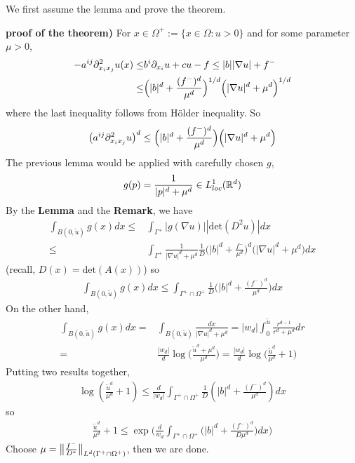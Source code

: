 \documentclass[12pt,a4paper]{article}
\newenvironment{proof}
{\begin{changemargin}{1cm}{0.5cm} 
	}%
	{\end{changemargin}
}
\newenvironment{p}
{\begin{proof} 
	}%
	{\end{proof}
}
\begin{document}
We first assume the lemma and prove the theorem.
\begin{p}
\textbf{proof of the theorem)} For $x\in \Omega^+ := \{x\in \Omega : u>0 \}$ and for some parameter $\mu>0$,
\begin{align*}
-a^{ij} \partial^2_{x_i x_j} u(x) \leq & b^i \partial_{x_i} u + cu -f \leq |b| |\nabla u| + f^- \\
\leq & \Big(|b|^d + \frac{(f^-)^d}{\mu^d} \Big)^{1/d} \Big(|\nabla u|^d + \mu^d \Big)^{1/d}
\end{align*}
where the last inequality follows from H\"older inequality. So
\begin{align*}
\big( a^{ij} \partial^2_{x_i x_j} u\big)^d \leq \Big(|b|^d + \frac{(f^-)^d}{\mu^d} \Big) \Big(|\nabla u|^d + \mu^d \Big)
\end{align*}
The previous lemma would be applied with carefully chosen $g$,
\begin{align*}
g(p) = \frac{1}{|p|^d + \mu^d} \in L^1_{loc}(\mathbb{R}^d)
\end{align*}
By the \textbf{Lemma} and the \textbf{Remark}, we have
\begin{align*}
\int_{B(0, \tilde{u})} g(x) dx \leq & \int_{\Gamma^+} |g(\nabla u)||\text{det}(D^2 u)| dx \\
\leq & \int_{\Gamma^+} \frac{1}{|\nabla u|^d + \mu^d} \frac{1}{D} \Big(|b|^d + \frac{f^-}{\mu^d} \Big)^d \Big(|\nabla u|^d + \mu^d \Big) dx
\end{align*}
(recall, $D(x) = \text{det}(A(x))$) so
\begin{align*}
\int_{B(0, \tilde{u})} g(x) dx \leq \int_{\Gamma^+ \cap \Omega^+} \frac{1}{D}  \Big(|b|^d + \frac{(f^-)^d}{\mu^d} \Big)dx
\end{align*}
On the other hand,
\begin{align*}
\int_{B(0, \tilde{u})} g(x) dx = & \int_{B(0, \tilde{u}) }\frac{dx}{|\nabla u|^d + \mu^d} = |w_d| \int_0^{\tilde{u}}\frac{r^{d-1}}{r^d + \mu^d} dr \\
= & \frac{|w_d|}{d} \log \Big(\frac{\tilde{u}^d + \mu^d}{\mu^d} \Big) =\frac{|w_d|}{d} \log \Big( \frac{\tilde{u}^d}{\mu^d} +1 \Big) 
\end{align*}
Putting two results together,
\begin{align*}
\log (\frac{\tilde{u}^d}{\mu^d}+1) \leq \frac{d}{|w_d|} \int_{\Gamma^+ \cap \Omega^+} \frac{1}{D} (|b|^d + \frac{(f^-)^d}{\mu^d}) dx
\end{align*}
so
\begin{align*}
\frac{\tilde{u}^d}{\mu^d}+1 \leq \exp \Big( \frac{d}{w_d} \int_{\Gamma^+ \cap \Omega^+} \big( |b|^d + \frac{(f^-)^d}{D \mu^d} \big)dx\Big)
\end{align*}
Choose $\mu = \bigl\lVert\frac{f^-}{D^*}\bigr\rVert_{L^d(\Gamma^+ \cap \Omega^+)}$, then we are done.

\eop
\end{p}
\s
\end{document}
